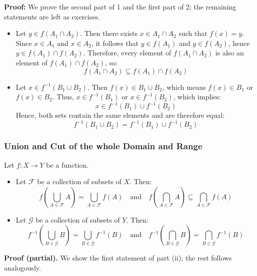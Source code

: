 \textbf{Proof:}
We prove the second part of 1 and the first part of 2; the 
remaining statements are left as exercises.

\begin{itemize}[label=\(-\)]
	
	\item  Let \( y \in f(A_1 \cap A_2) \). Then there exists \( x \in A_1 \cap A_2 \) such that 
	\( f(x) = y \). Since \( x \in A_1 \) and \( x \in A_2 \), it follows that \( y \in f(A_1) \) 
	and \( y \in f(A_2) \), hence \( y \in f(A_1) \cap f(A_2) \). Therefore, every element of \( f(A_1 \cap A_2) \) 
	is also an element of \( f(A_1) \cap f(A_2) \), so:
	      \[
		      f(A_1 \cap A_2) \subseteq f(A_1) \cap f(A_2)
	      \]

	\item Let \( x \in f^{-1} (B_1 \cup B_2) \). Then \( f(x) \in B_1 \cup B_2 \), which means \( f(x) \in B_1 \) 
	or \( f(x) \in B_2 \). Thus, \( x \in f^{-1}(B_1) \) 
	or \( x \in f^{-1}(B_2) \), which implies:
	      \[
		      x \in f^{-1}(B_1) \cup f^{-1}(B_2)
	      \]
	      Hence, both sets contain the same elements and are therefore equal:
	      \[
		      f^{-1}(B_1 \cup B_2) = f^{-1}(B_1) \cup f^{-1}(B_2)
	      \]
\end{itemize}

\subsubsection{Union and Cut of the whole Domain and Range}
Let \( f : X \to Y \) be a function.
\begin{itemize}[label =\(-\)]
	\item Let \( \mathcal{F} \) be a collection of subsets of \( X \). Then:
	      \[
		      f\left( \bigcup_{A \in \mathcal{F}} A \right) = \bigcup_{A \in \mathcal{F}} f(A)
		      \quad \text{and} \quad
		      f\left( \bigcap_{A \in \mathcal{F}} A \right) \subseteq \bigcap_{A \in \mathcal{F}} f(A)
	      \]

	\item Let \( \mathcal{G} \) be a collection of subsets of \( Y \). Then:
	      \[
		      f^{-1}\left( \bigcup_{B \in \mathcal{G}} B \right) = \bigcup_{B \in \mathcal{G}} f^{-1}(B)
		      \quad \text{and} \quad
		      f^{-1}\left( \bigcap_{B \in \mathcal{G}} B \right) = \bigcap_{B \in \mathcal{G}} f^{-1}(B)
	      \]
\end{itemize}

\textbf{Proof (partial).}
We show the first statement of part (ii); the rest follows analogously.

